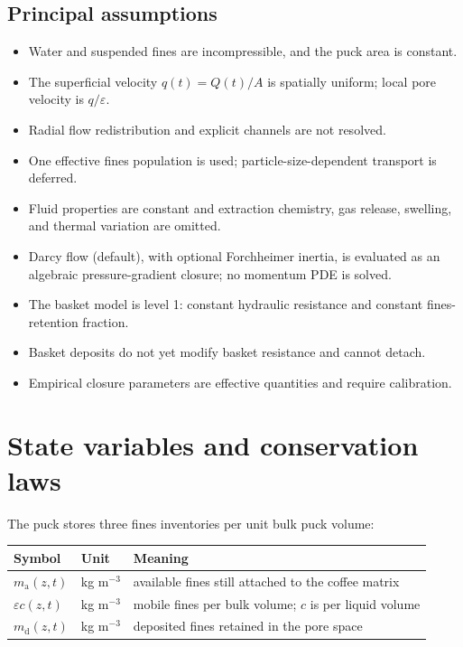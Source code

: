 \documentclass[11pt,a4paper]{article}
\begin{document}
\subsection{Principal assumptions}

\begin{itemize}
  \item Water and suspended fines are incompressible, and the puck area is constant.
  \item The superficial velocity $q(t)=Q(t)/A$ is spatially uniform; local pore velocity is $q/\varepsilon$.
  \item Radial flow redistribution and explicit channels are not resolved.
  \item One effective fines population is used; particle-size-dependent transport is deferred.
  \item Fluid properties are constant and extraction chemistry, gas release, swelling, and thermal variation are omitted.
  \item Darcy flow (default), with optional Forchheimer inertia, is evaluated as an algebraic
  pressure-gradient closure; no momentum PDE is solved.
  \item The basket model is level 1: constant hydraulic resistance and constant fines-retention fraction.
  \item Basket deposits do not yet modify basket resistance and cannot detach.
  \item Empirical closure parameters are effective quantities and require calibration.
\end{itemize}

\section{State variables and conservation laws}

The puck stores three fines inventories per unit bulk puck volume:
\begin{center}
\begin{tabularx}{0.92\textwidth}{@{}l l X@{}}
\toprule
Symbol & Unit & Meaning\\
\midrule
$m_{\mathrm a}(z,t)$ & kg m$^{-3}$ & available fines still attached to the coffee matrix\\
$\varepsilon c(z,t)$ & kg m$^{-3}$ & mobile fines per bulk volume; $c$ is per liquid volume\\
$m_{\mathrm d}(z,t)$ & kg m$^{-3}$ & deposited fines retained in the pore space\\
\bottomrule
\end{tabularx}
\end{center}
\end{document}
